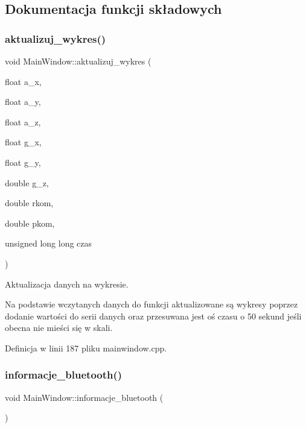 \subsection{Dokumentacja funkcji składowych}
\mbox{\label{class_main_window_ad6eb500a681306e95262d1c55dab9594}} 
\subsubsection{\texorpdfstring{aktualizuj\+\_\+wykres()}{aktualizuj\_wykres()}}
{\footnotesize\ttfamily void Main\+Window\+::aktualizuj\+\_\+wykres (\begin{DoxyParamCaption}\item[{float}]{a\+\_\+x,  }\item[{float}]{a\+\_\+y,  }\item[{float}]{a\+\_\+z,  }\item[{float}]{g\+\_\+x,  }\item[{float}]{g\+\_\+y,  }\item[{double}]{g\+\_\+z,  }\item[{double}]{rkom,  }\item[{double}]{pkom,  }\item[{unsigned long long}]{czas }\end{DoxyParamCaption})}



Aktualizacja danych na wykresie. 

Na podstawie wczytanych danych do funkcji aktualizowane są wykresy poprzez dodanie wartości do serii danych oraz przesuwana jest oś czasu o 50 sekund jeśli obecna nie mieści się w skali. 

Definicja w linii 187 pliku mainwindow.\+cpp.

\mbox{\label{class_main_window_ac3bcbf1dc657f039bf90254b24e023a5}} 
\subsubsection{\texorpdfstring{informacje\+\_\+bluetooth()}{informacje\_bluetooth()}}
{\footnotesize\ttfamily void Main\+Window\+::informacje\+\_\+bluetooth (\begin{DoxyParamCaption}{ }\end{DoxyParamCaption})}



